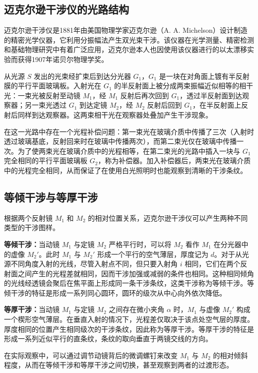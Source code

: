 ﻿\documentclass[12pt,a4paper]{article}
\begin{document}
\subsection{迈克尔逊干涉仪的光路结构}

迈克尔逊干涉仪是1881年由美国物理学家迈克尔逊（A. A. Michelson）设计制造的精密光学仪器，它利用分振幅法产生双光束干涉。该仪器在光学测量、精密检测和基础物理研究中有着广泛应用，迈克尔逊本人也因使用该仪器进行的以太漂移实验而获得1907年诺贝尔物理学奖。

从光源 $S$ 发出的光束经扩束后到达分光器 $G_1$，$G_1$ 是一块在对角面上镀有半反射膜的平行平面玻璃板。入射光在 $G_1$ 的半反射面上被分成两束振幅近似相等的相干光：一束光被反射至动镜 $M_1$，经 $M_1$ 反射后再次回到 $G_1$，透过半反射面到达观察器；另一束光透过 $G_1$ 到达定镜 $M_2$，经 $M_2$ 反射后回到 $G_1$，在半反射面上反射后同样到达观察器。这两束相干光在观察器处叠加产生干涉现象。

在这一光路中存在一个光程补偿问题：第一束光在玻璃介质中传播了三次（入射时透过玻璃基底，反射回来时在玻璃中传播两次），而第二束光仅在玻璃中传播一次。为了使两束光在玻璃介质中的光程相等，在第二束光的光路中插入一块与 $G_1$ 完全相同的平行平面玻璃板 $G_2$，称为补偿器。加入补偿器后，两束光在玻璃介质中的光程完全相同，从而保证了在使用白光照明时也能观察到清晰的干涉条纹。

\subsection{等倾干涉与等厚干涉}

根据两个反射镜 $M_1$ 和 $M_2$ 的相对位置关系，迈克尔逊干涉仪可以产生两种不同类型的干涉图样。

\textbf{等倾干涉：}当动镜 $M_1$ 与定镜 $M_2$ 严格平行时，可以将 $M_2$ 看作 $M_1$ 在分光器中的虚像 $M_2'$。此时 $M_1$ 与 $M_2'$ 形成一个平行的空气薄层，厚度记为 $d$。对于从光源不同角度入射的光线，尽管入射点不同，但只要入射角 $i$ 相同，它们在两个反射面之间产生的光程差就相同，因而干涉加强或减弱的条件也相同。这种相同倾角的光线经透镜会聚后在焦平面上形成同一条干涉条纹，这类干涉称为等倾干涉。等倾干涉的特征是形成一系列同心圆环，圆环的级次从中心向外依次降低。

\textbf{等厚干涉：}当动镜 $M_1$ 与定镜 $M_2$ 之间存在微小夹角 $\alpha$ 时，$M_1$ 与虚像 $M_2'$ 构成一个楔形空气薄层。在垂直入射的情况下，光程差仅取决于该点处空气层的厚度。厚度相同的位置产生相同级次的干涉条纹，因此称为等厚干涉。等厚干涉的特征是形成一系列近似平行的直条纹，条纹的取向垂直于两镜交线的方向。

在实际观察中，可以通过调节动镜背后的微调螺钉来改变 $M_1$ 与 $M_2$ 的相对倾斜程度，从而在等倾干涉和等厚干涉之间切换，甚至观察到两者的过渡形态。
\end{document}
